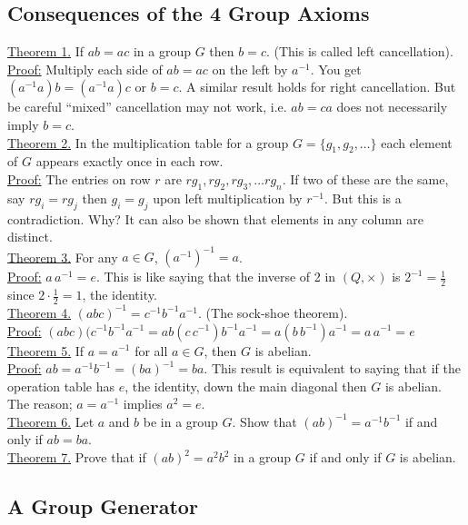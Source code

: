 \documentclass[12pt]{book}
\theoremstyle{definition}
\begin{document}
\subsection{Consequences of the 4 Group Axioms}
%
\underline{Theorem 1.} If $ab=ac$ in a group $G$ then $b=c$.  (This is called left cancellation).\\
\underline{Proof:}  Multiply each side of $ab=ac$ on the left by $a^{-1}$.  You get $(a^{-1}a)b=(a^{-1}a)c$ or $b=c$.  A similar result holds for right cancellation.  But be careful ``mixed'' cancellation may not work, i.e. $ab=ca$ does not necessarily imply $b=c$.\\[.1in]
%
\underline{Theorem 2.}  In the multiplication table for a group $G=\{g_1,g_2,\dots\}$ each element of $G$ appears exactly once in each row.\\
\underline{Proof:} The entries on row $r$ are $rg_1, rg_2,rg_3,\dots rg_n.$  If two of these are the same, say $rg_i=rg_j$ then $g_i=g_j$ upon left multiplication by $r^{-1}$.  But this is  a contradiction.  Why?  It can also be shown that elements in any column are distinct.\\[.1in]
%
\underline{Theorem 3.} For any $a\in G$, $(a^{-1})^{-1}=a$.\\
\underline{Proof:} $a\,a^{-1} = e$.  This is like saying that the inverse of 2 in $(Q,\times)$ is $2^{-1} =\frac12$ since $2\cdot\frac12=1$, the identity.\\[.1in]
%
\underline{Theorem 4.} $(abc)^{-1}=c^{-1}b^{-1}a^{-1}$.  (The sock-shoe theorem).\\
\underline{Proof:} $(abc)(c^{-1}b^{-1}a^{-1}=ab(c\,c^{-1})b^{-1}a^{-1}=a(b\,b^{-1})a^{-1} = a\,a^{-1} = e$\\[.1in]
%
\underline{Theorem 5.} If $a=a^{-1}$ for all $a\in G$, then $G$ is abelian.\\
\underline{Proof:}  $ab=a^{-1}b^{-1}=(ba)^{-1}=ba$.  This result is equivalent to saying that if the operation table has $e$, the identity, down the main diagonal then $G$ is abelian.  The reason; $a=a^{-1}$ implies $a^2=e$.\\[.1in]
%
\underline{Theorem 6.} Let $a$ and $b$ be in a group $G$. Show that $(ab)^{-1} = a^{-1}b^{-1}$ if and only if $ab=ba$.\\[.1in]
%
\underline{Theorem 7.} Prove that if $(ab)^2=a^2b^2$ in a group $G$ if and only if $G$ is abelian.

\subsection{A Group Generator}
\end{document}
